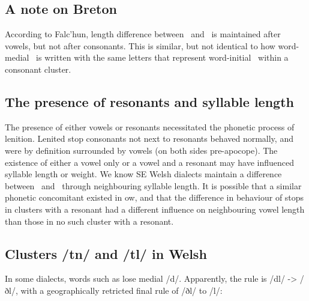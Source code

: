 \subsection{A note on Breton}
According to Falc'hun, length difference between \xD\ and \lT\ is maintained after vowels, but not after consonants. This is similar, but not identical to how word-medial \lT\ is written with the same letters that represent word-initial \xD\ within a consonant cluster.
\subsection{The presence of resonants and syllable length}
The presence of either vowels or resonants necessitated the phonetic process of lenition. Lenited stop consonants not next to resonants behaved normally, and were by definition surrounded by vowels (on both sides pre-apocope). The existence of either a vowel only or a vowel and a resonant may have influenced syllable length or weight. We know SE Welsh dialects maintain a difference between \xT\ and \xD\ through neighbouring syllable length. It is possible that a similar phonetic concomitant existed in \gls{ow}, and that the difference in behaviour of stops in clusters with a resonant had a different influence on neighbouring vowel length than those in no such cluster with a resonant.
\subsection{Clusters /tn/ and /tl/ in Welsh}
In some dialects, words such as  lose medial /d/. Apparently, the rule is /dl/ -> /ðl/, with a geographically retricted final rule of /ðl/ to /l/:


